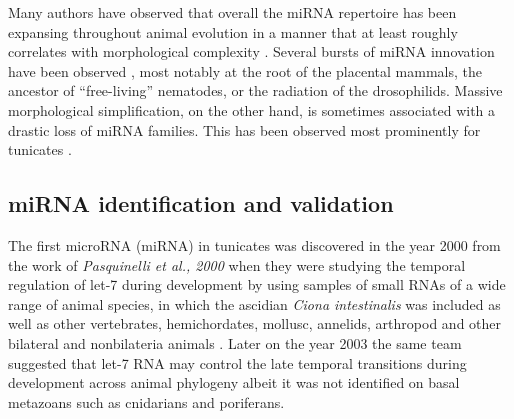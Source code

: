 \documentclass[graybox]{svmult}
\begin{document}
Many authors have observed that overall the miRNA repertoire has been
expansing throughout animal evolution in a manner that at least roughly
correlates with morphological complexity
\cite{Hertel:06a,Sempere:06,Niwa:07,Prochnik:07,Lee:07a,Heimberg:08,Peterson:09,Berezikov:11}. 
Several bursts of miRNA innovation have been observed
\cite{Hertel:06a,Heimberg:08,Tanzer:10a,Hertel:15a}, most notably at the
root of the placental mammals, the ancestor of ``free-living'' nematodes,
or the radiation of the drosophilids. Massive morphological simplification,
on the other hand, is sometimes associated with a drastic loss of miRNA
families. This has been observed most prominently for tunicates
\cite{Fu:08,Dai:09}.



\subsection{miRNA identification and validation}

The first microRNA (miRNA) in tunicates was discovered in the year 2000 from the work of \textit{Pasquinelli et al., 2000} when they were studying the temporal regulation of let-7 during development by using samples of small RNAs of a wide range of animal species, in which the ascidian \textit{Ciona intestinalis} was included as well as other vertebrates, hemichordates, mollusc, annelids, arthropod and other bilateral and nonbilateria animals \cite{Pasquinelli2000}. Later on the year 2003  the same team suggested that let-7 RNA may control the late temporal transitions during development across animal phylogeny \cite{Pasquinelli2003} albeit it was not identified on basal metazoans such as cnidarians and poriferans. 
\end{document}
